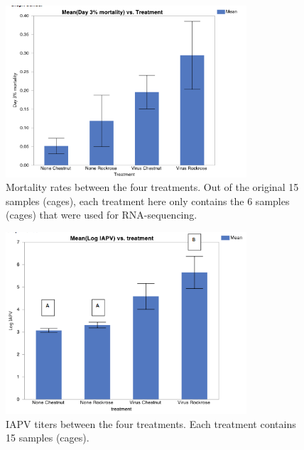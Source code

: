 \documentclass[11pt,a4paper,oldfontcommands,openany]{memoir}
\numberwithin{equation}{section} %
\begin{document}
\begin{figure}[H]
\centering
  \begin{framed}
  \includegraphics[width=0.8\textwidth]{Images/mortalityRNASeq}
  \end{framed}
  \caption{Mortality rates between the four treatments. Out of the original 15 samples (cages), each treatment here only contains the 6 samples (cages) that were used for RNA-sequencing.}
  \label{fig:mortalityRNASeq}
\end{figure}

\begin{figure}[H]
\centering
  \begin{framed}
  \includegraphics[width=0.8\textwidth]{Images/IAPVAll}
  \end{framed}
  \caption{IAPV titers between the four treatments. Each treatment contains 15 samples (cages).}
  \label{fig:IAPVAll}
\end{figure}
\end{document}
